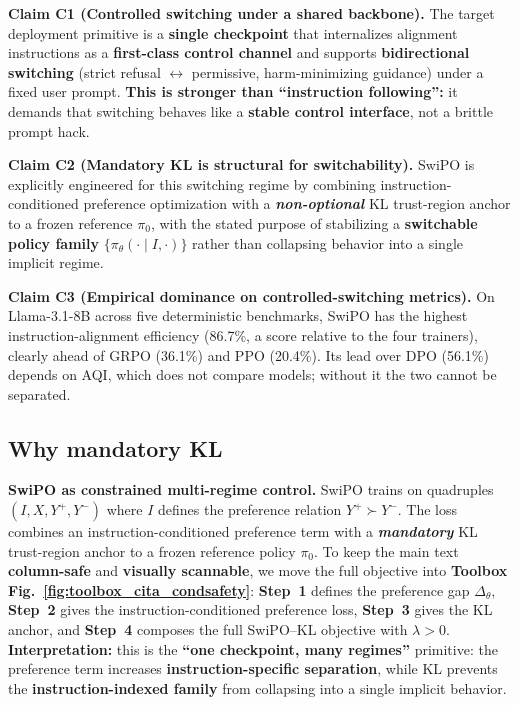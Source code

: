 \noindent\textbf{Claim C1 (Controlled switching under a shared backbone).}
The target deployment primitive is a \textbf{single checkpoint} that internalizes alignment instructions as a \textbf{first-class control channel} and supports \textbf{bidirectional switching} (strict refusal $\leftrightarrow$ permissive, harm-minimizing guidance) under a fixed user prompt. \textbf{This is stronger than ``instruction following'':} it demands that switching behaves like a \textbf{stable control interface}, not a brittle prompt hack.

\noindent\textbf{Claim C2 (Mandatory KL is structural for switchability).}
SwiPO is explicitly engineered for this switching regime by combining instruction-conditioned preference optimization with a \textbf{\emph{non-optional}} KL trust-region anchor to a frozen reference $\pi_0$, with the stated purpose of stabilizing a \textbf{switchable policy family} $\{\pi_\theta(\cdot\mid I,\cdot)\}$ rather than collapsing behavior into a single implicit regime.

\noindent\textbf{Claim C3 (Empirical dominance on controlled-switching metrics).}
On Llama-3.1-8B across five deterministic benchmarks, SwiPO has the highest instruction-alignment efficiency (86.7\%, a score relative to the four trainers), clearly ahead of GRPO (36.1\%) and PPO (20.4\%). Its lead over DPO (56.1\%) depends on AQI, which does not compare models; without it the two cannot be separated.


\vspace{-0.35em}
\subsection{Why mandatory KL}
\vspace{-0.2em}

\noindent\textbf{SwiPO as constrained multi-regime control.}
SwiPO trains on quadruples $(I,X,Y^+,Y^-)$ where $I$ defines the preference relation $Y^+\succ Y^-$. The loss combines an instruction-conditioned preference term with a \textbf{\emph{mandatory}} KL trust-region anchor to a frozen reference policy $\pi_0$. To keep the main text \textbf{column-safe} and \textbf{visually scannable}, we move the full objective into \textbf{Toolbox Fig.~\ref{fig:toolbox_cita_condsafety}}: \textbf{Step~1} defines the preference gap $\Delta_\theta$, \textbf{Step~2} gives the instruction-conditioned preference loss, \textbf{Step~3} gives the KL anchor, and \textbf{Step~4} composes the full SwiPO--KL objective with $\lambda>0$. \textbf{Interpretation:} this is the \textbf{``one checkpoint, many regimes''} primitive: the preference term increases \textbf{instruction-specific separation}, while KL prevents the \textbf{instruction-indexed family} from collapsing into a single implicit behavior.

